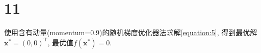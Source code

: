 \section*{11}

使用含有动量(momentum=0.9)的随机梯度优化器法求解\cref{equation:5},
得到最优解$\bm{x}^*=(0,0)^\mathrm{T}$, 最优值$f(\bm{x}^*)=0$.
